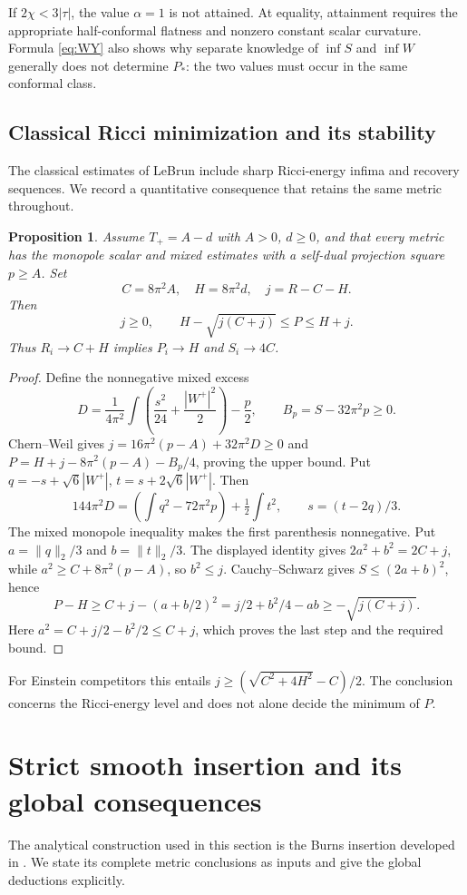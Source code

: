 \documentclass[11pt,a4paper]{article}
\newtheorem{proposition}[theorem]{Proposition}
\theoremstyle{definition}\newtheorem{definition}[theorem]{Definition}
\theoremstyle{remark}\newtheorem{remark}[theorem]{Remark}
\newcommand{\norm}[1]{\lVert #1\rVert}
\begin{document}
If $2\chi<3|\tau|$, the value $\alpha=1$ is not attained. At equality, attainment requires the appropriate half-conformal flatness and nonzero constant scalar curvature. Formula \eqref{eq:WY} also shows why separate knowledge of $\inf S$ and $\inf W$ generally does not determine $P_*$: the two values must occur in the same conformal class.

\subsection{Classical Ricci minimization and its stability}
The classical estimates of LeBrun \cite{LeBrunRicci,LeBrunYamabe} include sharp Ricci-energy infima and recovery sequences. We record a quantitative consequence that retains the same metric throughout.

\begin{proposition}\label{prop:Ricmin}
Assume $T_+=A-d$ with $A>0$, $d\ge0$, and that every metric has the monopole scalar and mixed estimates with a self-dual projection square $p\ge A$. Set
\[
 C=8\pi^2A,\quad H=8\pi^2d,\quad j=R-C-H.
\]
Then
\begin{equation}\label{eq:Ricmin}
 j\ge0,\qquad H-\sqrt{j(C+j)}\le P\le H+j.
\end{equation}
Thus $R_i\to C+H$ implies $P_i\to H$ and $S_i\to4C$.
\end{proposition}
\begin{proof}
Define the nonnegative mixed excess
\[
 D=\frac1{4\pi^2}\int\left(\frac{s^2}{24}+\frac{|W^+|^2}{2}\right)-\frac p2,
 \qquad B_p=S-32\pi^2p\ge0.
\]
Chern--Weil gives $j=16\pi^2(p-A)+32\pi^2D\ge0$ and
$P=H+j-8\pi^2(p-A)-B_p/4$, proving the upper bound. Put
$q=-s+\sqrt6|W^+|$, $t=s+2\sqrt6|W^+|$. Then
\[
 144\pi^2D=\left(\int q^2-72\pi^2p\right)+\tfrac12\int t^2,
 \qquad s=(t-2q)/3.
\]
The mixed monopole inequality makes the first parenthesis nonnegative. Put
$a=\norm q_2/3$ and $b=\norm t_2/3$. The displayed identity gives
$2a^2+b^2=2C+j$, while $a^2\ge C+8\pi^2(p-A)$, so $b^2\le j$.
Cauchy--Schwarz gives $S\le(2a+b)^2$, hence
\[
 P-H\ge C+j-(a+b/2)^2
 =j/2+b^2/4-ab\ge-\sqrt{j(C+j)}.
\]
Here $a^2=C+j/2-b^2/2\le C+j$, which proves the last step and the required bound.
\end{proof}
For Einstein competitors this entails
$j\ge(\sqrt{C^2+4H^2}-C)/2$. The conclusion concerns the Ricci-energy level and does not alone decide the minimum of $P$.

\section{Strict smooth insertion and its global consequences}
The analytical construction used in this section is the Burns insertion developed in \cite{RepoInsertion,RepoFour}. We state its complete metric conclusions as inputs and give the global deductions explicitly.
\end{document}
